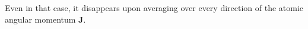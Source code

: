 Even in that case, it disappears upon averaging over every direction of the atomic angular momentum $\mathbf J$.
